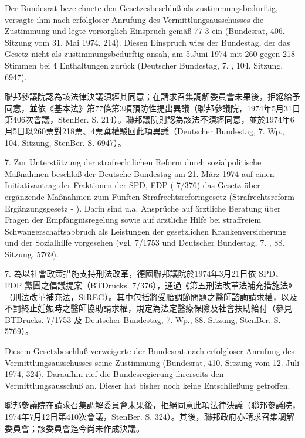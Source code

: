 \documentclass[12pt]{article}
\begin{document}
\syncleft
\begin{sourcepara}
Der Bundesrat bezeichnete den Gesetzesbeschluß als zustimmungsbedürftig, versagte ihm nach erfolgloser Anrufung des Vermittlungsausschusses die Zustimmung und legte vorsorglich Einspruch gemäß \abbrArt{} 77 \abbrAbs{} 3 \abbrGG{}\ggfnArtSevenSevenThreeDE{} ein (Bundesrat, 406. Sitzung vom 31. Mai 1974, \abbrStenBer{} \abbrS{} 214). Diesen Einspruch wies der Bundestag, der das Gesetz nicht als zustimmungsbedürftig ansah, am 5.Juni 1974 mit 260 gegen 218 Stimmen bei 4 Enthaltungen zurück (Deutscher Bundestag, 7. \abbrWp{}, 104. Sitzung, \abbrStenBer{} \abbrS{} 6947).
\end{sourcepara}
\begin{transpara}
聯邦參議院認為該法律決議須經其同意；在請求召集調解委員會未果後，拒絕給予同意，並依《基本法》第77條第3項\ggfnArtSevenSevenThreeZH{}預防性提出異議（聯邦參議院，1974年5月31日第406次會議，StenBer. S. 214）。聯邦議院則認為該法不須經同意，並於1974年6月5日以260票對218票、4票棄權駁回此項異議（Deutscher Bundestag, 7. Wp., 104. Sitzung, StenBer. S. 6947）。
\end{transpara}

\syncleft
\begin{sourcepara}
7. Zur Unterstützung der strafrechtlichen Reform durch sozialpolitische Maßnahmen beschloß der Deutsche Bundestag am 21. März 1974 auf einen Initiativantrag der Fraktionen der SPD, FDP (\abbrBTDrucks{} 7/376) das Gesetz über ergänzende Maßnahmen zum Fünften Strafrechtsreformgesetz (Strafrechtsreform-Ergänzungsgesetz - \abbrStREG{}). Darin sind u.a. Ansprüche auf ärztliche Beratung über Fragen der Empfängnisregelung sowie auf ärztliche Hilfe bei straffreiem Schwangerschaftsabbruch als Leistungen der gesetzlichen Krankenversicherung und der Sozialhilfe vorgesehen (vgl. \abbrBTDrucks{} 7/1753 und Deutscher Bundestag, 7. \abbrWp{}, 88. Sitzung, \abbrStenBer{} \abbrS{} 5769).
\end{sourcepara}
\begin{transpara}
7. 為以社會政策措施支持刑法改革，德國聯邦議院於1974年3月21日依 SPD、FDP 黨團之倡議提案（BTDrucks. 7/376），通過《第五刑法改革法補充措施法》（刑法改革補充法，StREG）。其中包括將受胎調節問題之醫師諮詢請求權，以及不罰終止妊娠時之醫師協助請求權，規定為法定醫療保險及社會扶助給付（參見 BTDrucks. 7/1753 及 Deutscher Bundestag, 7. Wp., 88. Sitzung, StenBer. S. 5769）。
\end{transpara}

\syncleft
\begin{sourcepara}
Diesem Gesetzbeschluß verweigerte der Bundesrat nach erfolgloser Anrufung des Vermittlungsausschusses seine Zustimmung (Bundesrat, 410. Sitzung vom 12. Juli 1974, \abbrStenBer{} \abbrS{} 324). Daraufhin rief die Bundesregierung ihrerseits den Vermittlungsausschuß an. Dieser hat bisher noch keine Entschließung getroffen.
\end{sourcepara}
\begin{transpara}
聯邦參議院在請求召集調解委員會未果後，拒絕同意此項法律決議（聯邦參議院，1974年7月12日第410次會議，StenBer. S. 324）。其後，聯邦政府亦請求召集調解委員會；該委員會迄今尚未作成決議。
\end{transpara}
\end{document}
